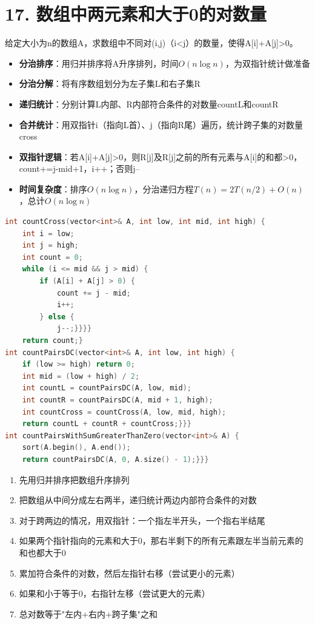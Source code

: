 \section*{17. 数组中两元素和大于0的对数量}

给定大小为n的数组A，求数组中不同对(i,j)（i<j）的数量，使得A[i]+A[j]>0。

\begin{itemize}
    \item \textbf{分治排序}：用归并排序将A升序排列，时间$O(n\log n)$，为双指针统计做准备
    \item \textbf{分治分解}：将有序数组划分为左子集L和右子集R
    \item \textbf{递归统计}：分别计算L内部、R内部符合条件的对数量countL和countR
    \item \textbf{合并统计}：用双指针i（指向L首）、j（指向R尾）遍历，统计跨子集的对数量cross
    \item \textbf{双指针逻辑}：若A[i]+A[j]>0，则R[j]及R[j]之前的所有元素与A[i]的和都>0，count+=j-mid+1，i++；否则j--
    \item \textbf{时间复杂度}：排序$O(n\log n)$，分治递归方程$T(n)=2T(n/2)+O(n)$，总计$O(n\log n)$
\end{itemize}

\begin{lstlisting}[language=C++, style=cppstyle]
int countCross(vector<int>& A, int low, int mid, int high) {
    int i = low;
    int j = high;
    int count = 0;
    while (i <= mid && j > mid) {
        if (A[i] + A[j] > 0) {
            count += j - mid;
            i++;
        } else {
            j--;}}}}
    return count;}
int countPairsDC(vector<int>& A, int low, int high) {
    if (low >= high) return 0;
    int mid = (low + high) / 2;
    int countL = countPairsDC(A, low, mid);
    int countR = countPairsDC(A, mid + 1, high);
    int countCross = countCross(A, low, mid, high);
    return countL + countR + countCross;}}}
int countPairsWithSumGreaterThanZero(vector<int>& A) {
    sort(A.begin(), A.end());
    return countPairsDC(A, 0, A.size() - 1);}}}
\end{lstlisting}

\begin{enumerate}
    \item 先用归并排序把数组升序排列
    \item 把数组从中间分成左右两半，递归统计两边内部符合条件的对数
    \item 对于跨两边的情况，用双指针：一个指左半开头，一个指右半结尾
    \item 如果两个指针指向的元素和大于0，那右半剩下的所有元素跟左半当前元素的和也都大于0
    \item 累加符合条件的对数，然后左指针右移（尝试更小的元素）
    \item 如果和小于等于0，右指针左移（尝试更大的元素）
    \item 总对数等于"左内+右内+跨子集"之和
\end{enumerate}
